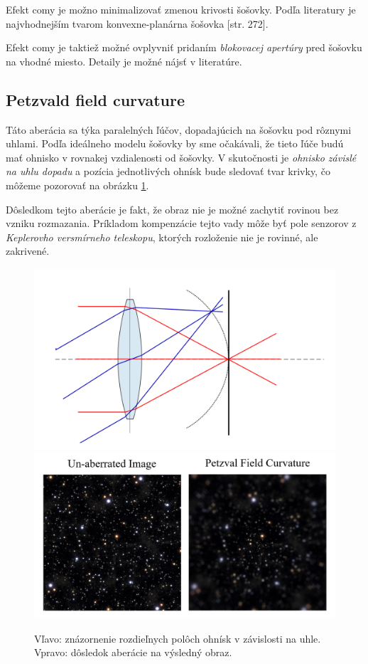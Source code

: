 Efekt comy je možno minimalizovať zmenou krivosti šošovky. Podľa literatury je najvhodnejším tvarom 
konvexne-planárna šošovka \cite{hechtoptics}[str. 272].

Efekt comy je taktiež možné ovplyvniť pridaním \textit{blokovacej apertúry} pred šošovku na vhodné miesto.
Detaily je možné nájsť v literatúre\cite{hechtoptics}.

\subsection{Petzvald field curvature}
Táto aberácia sa týka paralelných ľúčov, dopadajúcich na šošovku pod rôznymi uhlami. Podľa ideálneho modelu
šošovky by sme očakávali, že tieto ľúče budú mať ohnisko v rovnakej vzdialenosti od šošovky. 
V skutočnosti je \textit{ohnisko závislé na uhlu dopadu} a pozícia jednotlivých ohnísk bude sledovať tvar
krivky, čo môžeme pozorovať na obrázku \ref{comaDescribe}.

Dôsledkom tejto aberácie je fakt, že obraz nie je možné zachytiť rovinou bez vzniku rozmazania. 
Príkladom kompenzácie tejto vady môže byť pole senzorov z \textit{Keplerovho versmírneho teleskopu},
ktorých rozloženie nie je rovinné, ale zakrivené.

\begin{figure}[h]
    \label{comaDescribe}
\includegraphics[scale=0.15]{obrazky-figures/fieldcurvature.png}
\includegraphics[scale=0.60]{obrazky-figures/fieldAberration.jpg}
    \centering \caption{Vľavo: znázornenie rozdieľnych polôch ohnísk v závislosti na uhle. Vpravo:
    dôsledok aberácie na výsledný obraz.}
\end{figure}



